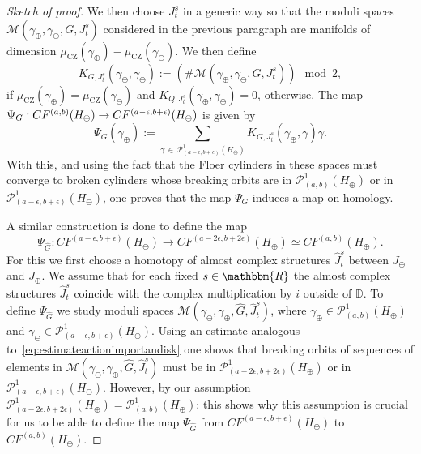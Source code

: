 \documentclass[AHL,Unicode,longabstracts,published]{cedram}
\newcommand{\R}{\mathbbm{R}}
\newcommand{\D}{\mathbb{D}}
\newcommand{\rCZ}{\mathrm{CZ}}
\newcommand{\clP}{\mathcal{P}}
\newcommand{\clM}{\mathcal{M}}
\begin{document}
\begin{proof}[Sketch of proof]
We then choose $J^s_t$ in a generic way so that the moduli spaces $\clM(\gamma_\oplus,\gamma_\ominus,G,J^s_t) $ considered in the previous paragraph are manifolds of dimension  $\mu_{\rCZ}(\gamma_\oplus) - \mu_{\rCZ}(\gamma_\ominus)$. We then define
\[
K_{G,J^s_t}(\gamma_\oplus, \gamma_\ominus):= \left(\# \clM(\gamma_\oplus, \gamma_\ominus, G,J^s_t)\right)\mod 2,
\]
if $\mu_{\rCZ}(\gamma_\oplus) = \mu_{\rCZ}(\gamma_\ominus)$ and $K_{Q,J^s_t}(\gamma_\oplus, \gamma_\ominus)=0$, otherwise. The map $\Psi_G: CF^{(a,b)}(H_\oplus)\linebreak \to CF^{(a-\epsilon, b+\epsilon)}(H_\ominus)$ is given by
\begin{equation}\label{eq:defiGdisk}
\Psi_G(\gamma_\oplus):= \sum_{\gamma\,\in\,\clP^1_{(a-\epsilon,b+\epsilon)}(H_\ominus)} K_{G,J^s_t}(\gamma_\oplus, \gamma) \gamma.
\end{equation}
With this, and using the fact that the Floer cylinders in these spaces must converge to broken cylinders whose breaking orbits are in $\clP^1_{(a,b)}(H_\oplus)$ or in $\clP^1_{(a-\epsilon,b+\epsilon)}(H_\ominus)$, one proves that the map $\Psi_G$ induces a map on homology.


A similar construction is done to define the map
\[
\Psi_{\widehat{G}}: CF^{(a-\epsilon, b+\epsilon)}(H_\ominus) \to CF^{(a-2\epsilon,b+ 2 \epsilon)}(H_\oplus) \simeq CF^{(a,b)}(H_\oplus).
\]
For this we first choose a homotopy of almost complex structures $\widehat{J}^s_t$ between $J_\ominus$ and $J_\oplus$. We assume that for each fixed $s \in \R$ the almost complex structures $\widehat{J}^s_t$ coincide with the complex multiplication by ${i}$ outside of $\D$. To define $\Psi_{\widehat{G}}$ we study moduli spaces $\clM(\gamma_\ominus, \gamma_\oplus, \widehat{G},\widehat{J}^s_t)$, where $\gamma_\oplus \in \clP^1_{(a,b)}(H_\oplus)$ and $\gamma_\ominus \in \clP^1_{(a-\epsilon,b+\epsilon)}(H_\ominus)$. Using an estimate analogous to~\eqref{eq:estimateactionimportandisk} one shows that breaking orbits of sequences of elements in $\clM(\gamma_\ominus, \gamma_\oplus, \widehat{G},\widehat{J}^s_t)$ must be in $\clP^1_{(a-2\epsilon,b+2\epsilon)}(H_\oplus)$ or in $\clP^1_{(a-\epsilon,b+\epsilon)}(H_\ominus)$. However, by our assumption $\clP^1_{(a-2\epsilon,b+2\epsilon)}(H_\oplus) = \clP^1_{(a,b)}(H_\oplus)$: this shows why this assumption is crucial for us to be able to define the map $\Psi_{\widehat{G}}$ from $CF^{(a-\epsilon, b+\epsilon)}(H_\ominus)$ to $ CF^{(a,b)}(H_\oplus) $.


\end{proof}
\end{document}
